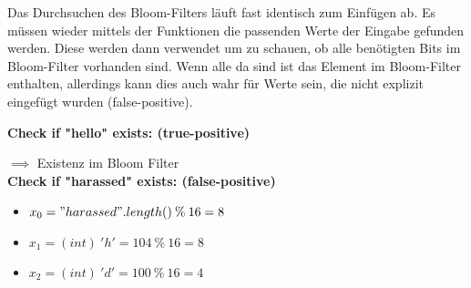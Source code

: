 \documentclass[
../../AuD-Zusammenfassung.tex,
]
{subfiles}
\begin{document}
\newpage
Das Durchsuchen des Bloom-Filters läuft fast identisch zum Einfügen ab. Es müssen wieder mittels der Funktionen die passenden Werte der Eingabe gefunden werden. Diese werden dann verwendet um zu schauen, ob alle benötigten Bits im Bloom-Filter vorhanden sind. Wenn alle da sind ist das Element im Bloom-Filter enthalten, allerdings kann dies auch wahr für Werte sein, die nicht explizit eingefügt wurden (false-positive).

\textbf{Check if "hello" exists: (true-positive)}\\
\begin{minipage}[t]{\textwidth}
    \centering
\end{minipage}
$\implies$ Existenz im Bloom Filter\\[20pt]
\textbf{Check if "harassed" exists: (false-positive)}\\
\begin{itemize}
    \item $ x_0 = "harassed".length() \:\% \: 16 = 8$
    \item $ x_1 = (int)\: 'h' = 104  \:\% \: 16 = 8$ 
    \item $ x_2 = (int)\: 'd' = 100  \:\% \: 16 = 4$
\end{itemize}
\end{document}
